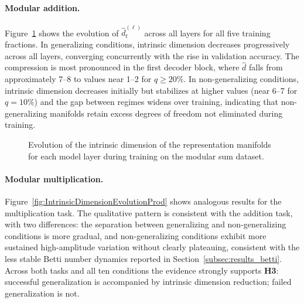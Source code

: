 \paragraph{Modular addition.}
Figure~\ref{fig:IntrinsicDimensionEvolutionSum} shows the evolution of $\hat{d}^{(\ell)}_t$ across all layers for all five training fractions. In generalizing conditions, intrinsic dimension decreases progressively across all layers, converging concurrently with the rise in validation accuracy. The compression is most pronounced in the first decoder block, where $\hat{d}$ falls from approximately 7--8 to values near 1--2 for $q \geq 20\%$. In non-generalizing conditions, intrinsic dimension decreases initially but stabilizes at higher values  (near 6--7 for $q = 10\%$) and the gap between regimes widens over training, indicating that non-generalizing manifolds retain excess degrees of freedom not eliminated during training.

\begin{figure}[H]
    \centering
     
     
     
    \caption[Intrinsic dimension evolution (Modular Sum).]{Evolution of the intrinsic dimension of the representation manifolds for each model layer during training on the modular sum dataset.}
    \label{fig:IntrinsicDimensionEvolutionSum}
\end{figure}


\paragraph{Modular multiplication.}
Figure~\ref{fig:IntrinsicDimensionEvolutionProd} shows analogous results for the multiplication task. The qualitative pattern is consistent with the addition task, with two differences: the separation between generalizing and non-generalizing conditions is more gradual, and non-generalizing conditions exhibit more sustained high-amplitude variation without clearly plateauing, consistent with the less stable Betti number dynamics reported in Section~\ref{subsec:results_betti}. Across both tasks and all ten conditions the evidence strongly supports \textbf{H3}: successful generalization is accompanied by intrinsic dimension reduction; failed generalization is not. %

